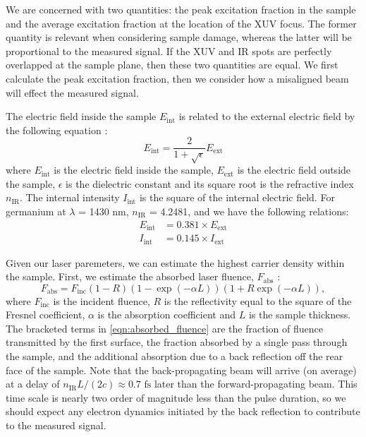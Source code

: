 We are concerned with two quantities: the peak excitation fraction in the sample and the average excitation fraction at the location of the XUV focus. The former quantity is relevant when considering sample damage, whereas the latter will be proportional to the measured signal. If the XUV and IR spots are perfectly overlapped at the sample plane, then these two quantities are equal. We first calculate the peak excitation fraction, then we consider how a misaligned beam will effect the measured signal.

The electric field inside the sample $E_{\text{int}}$ is related to the external electric field by the following equation \cite{schultzeAttosecondBandgapDynamics2014}:
\begin{equation}
E_{\text{int}} = \frac{2}{1+\sqrt{\epsilon}} E_{\text{ext}}
\label{eqn:internal_external_Efield}
\end{equation}
where $E_{\text{int}}$ is the electric field inside the sample, $E_{\text{ext}}$ is the electric field outside the sample, $\epsilon$ is the dielectric constant and its square root is the refractive index $n_{\text{IR}}$. The internal intensity $I_{\text{int}}$ is the square of the internal electric field. For germanium at $\lambda$ = 1430 nm, $n_{\text{IR}}$ = 4.2481, and we have the following relations:
\begin{equation}
\begin{aligned}
E_{\text{int}} &= 0.381 \times E_{\text{ext}} \\
I_{\text{int}} &= 0.145 \times I_{\text{ext}}
\end{aligned}
\end{equation}

Given our laser paremeters, we can estimate the highest carrier density within the sample. First, we estimate the absorbed laser fluence, $F_{\text{abs}}$ \cite{harbCarrierRelaxationLattice2006}:
\begin{equation}
F_{\text{abs}} = F_{\text{inc}} \left(1-R\right) \left( 1-\exp(-\alpha L) \right) \left(1+R \exp(-\alpha L)\right),
\label{eqn:absorbed_fluence}
\end{equation}
where $F_{\text{inc}}$ is the incident fluence, $R$ is the reflectivity equal to the square of the Fresnel coefficient, $\alpha$ is the absorption coefficient and $L$ is the sample thickness. The bracketed terms in \cref{eqn:absorbed_fluence} are the fraction of fluence transmitted by the first surface, the fraction absorbed by a single pass through the sample, and the additional absorption due to a back reflection off the rear face of the sample. Note that the back-propagating beam will arrive (on average) at a delay of $n_{\text{IR}} L/(2c) \approx 0.7 \text{ fs}$ later than the forward-propagating beam. This time scale is nearly two order of magnitude less than the pulse duration, so we should expect any electron dynamics initiated by the back reflection to contribute to the measured signal.

